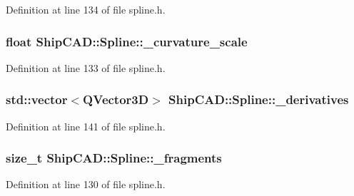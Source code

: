 Definition at line 134 of file spline.\-h.

\hypertarget{classShipCAD_1_1Spline_ac9b097c34a061077a02fc9e1563b3e86}{
\subsubsection[{\-\_\-curvature\-\_\-scale}]{\setlength{\rightskip}{0pt plus 5cm}float Ship\-C\-A\-D\-::\-Spline\-::\-\_\-curvature\-\_\-scale\hspace{0.3cm}{\ttfamily [protected]}}}\label{classShipCAD_1_1Spline_ac9b097c34a061077a02fc9e1563b3e86}


Definition at line 133 of file spline.\-h.

\hypertarget{classShipCAD_1_1Spline_a8478f85abd680e3caee34dc230eed3e7}{
\subsubsection[{\-\_\-derivatives}]{\setlength{\rightskip}{0pt plus 5cm}std\-::vector$<$Q\-Vector3\-D$>$ Ship\-C\-A\-D\-::\-Spline\-::\-\_\-derivatives\hspace{0.3cm}{\ttfamily [protected]}}}\label{classShipCAD_1_1Spline_a8478f85abd680e3caee34dc230eed3e7}


Definition at line 141 of file spline.\-h.

\hypertarget{classShipCAD_1_1Spline_ac12e47ffb75b6d84877f849d18323622}{
\subsubsection[{\-\_\-fragments}]{\setlength{\rightskip}{0pt plus 5cm}size\-\_\-t Ship\-C\-A\-D\-::\-Spline\-::\-\_\-fragments\hspace{0.3cm}{\ttfamily [protected]}}}\label{classShipCAD_1_1Spline_ac12e47ffb75b6d84877f849d18323622}


Definition at line 130 of file spline.\-h.

